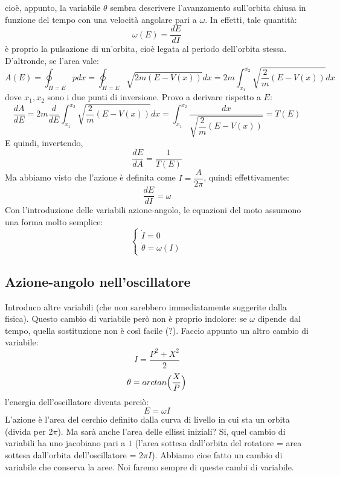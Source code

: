 \documentclass[a4paper,openany]{article}
\begin{document}
	cioè, appunto, la variabile $\theta$ sembra descrivere l'avanzamento sull'orbita chiusa in funzione del tempo con una velocità angolare pari a $\omega$. In effetti, tale quantità:
	$$
	\omega(E) = \dfrac{dE}{dI} 
	$$
	è proprio la pulsazione di un'orbita, cioè legata al periodo dell'orbita stessa. D'altronde, se l'area vale:
	$$
	A(E) = \oint_{H=E} p dx = \oint_{H=E} \sqrt{2m(E-V(x))}dx = 2m\int_{x_1}^{x_2} \sqrt{\dfrac{2}{m}(E-V(x))}dx
	$$
	dove $x_1, x_2$ sono i due punti di inversione. Provo a derivare rispetto a $E$:
	\begin{equation}\label{key}
		\dfrac{dA}{dE} = 2m\dfrac{d}{dE} \int_{x_1}^{x_2} \sqrt{\dfrac{2}{m}(E-V(x))}dx = \int_{x_1}^{x_2} \frac{dx}{\sqrt{\dfrac{2}{m}(E-V(x))}} = T(E)
	\end{equation}
	E quindi, invertendo,
	\begin{equation}\label{key}
		\dfrac{dE}{dA} = \dfrac{1}{T(E)}
	\end{equation}
	Ma abbiamo visto che l'azione è definita come $I = \dfrac{A}{2\pi}$, quindi effettivamente:
	\begin{equation}\label{key}
		\dfrac{dE}{dI} = \omega
	\end{equation}
	Con l'introduzione delle variabili azione-angolo, le equazioni del moto assumono una forma molto semplice:
	\begin{equation}\label{key}
		\begin{cases}
			\dot{I} = 0 \\
			\dot{\theta} = \omega(I)
		\end{cases}
	\end{equation}
	\subsection{Azione-angolo nell'oscillatore}
	Introduco altre variabili (che non sarebbero immediatamente suggerite dalla fisica). Questo cambio di variabile però non è proprio indolore: se $\omega$ dipende dal tempo, quella sostituzione non è così facile (?). Faccio appunto un altro cambio di variabile:
	$$
	I = \dfrac{P^{2}+X^{2}}{2}
	$$
	$$
	\theta = arctan\Bigl(\dfrac{X}{P}\Bigl)
	$$
	l'energia dell'oscillatore diventa perciò:
	$$
	E = \omega I
	$$
	L'azione è l'area del cerchio definito dalla curva di livello in cui sta un orbita (divida per 2$\pi$). Ma sarà anche l'area delle ellissi iniziali? Si, quel cambio di variabili ha uno jacobiano pari a $1$ (l'area sottesa dall'orbita del rotatore = area sottesa dall'orbita dell'oscillatore = 2$\pi I$). Abbiamo cioe fatto un cambio di variabile che conserva la aree. Noi faremo sempre di queste cambi di variabile.
	
\end{document}

